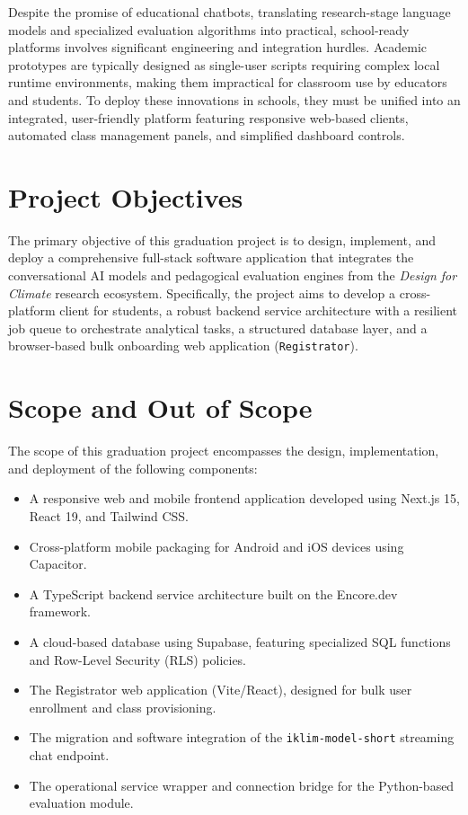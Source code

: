 \documentclass[12pt,a4paper,oneside]{report}
\begin{document}
    Despite the promise of educational chatbots, translating research-stage language models and specialized evaluation algorithms into practical, school-ready platforms involves significant engineering and integration hurdles. Academic prototypes are typically designed as single-user scripts requiring complex local runtime environments, making them impractical for classroom use by educators and students. To deploy these innovations in schools, they must be unified into an integrated, user-friendly platform featuring responsive web-based clients, automated class management panels, and simplified dashboard controls.

    \section{Project Objectives}
    The primary objective of this graduation project is to design, implement, and deploy a comprehensive full-stack software application that integrates the conversational AI models and pedagogical evaluation engines from the \textit{Design for Climate} research ecosystem. Specifically, the project aims to develop a cross-platform client for students, a robust backend service architecture with a resilient job queue to orchestrate analytical tasks, a structured database layer, and a browser-based bulk onboarding web application (\texttt{Registrator}).

    \section{Scope and Out of Scope}
    The scope of this graduation project encompasses the design, implementation, and deployment of the following components:
    \begin{itemize}
        \item A responsive web and mobile frontend application developed using Next.js 15, React 19, and Tailwind CSS.
        \item Cross-platform mobile packaging for Android and iOS devices using Capacitor.
        \item A TypeScript backend service architecture built on the Encore.dev framework.
        \item A cloud-based database using Supabase, featuring specialized SQL functions and Row-Level Security (RLS) policies.
        \item The Registrator web application (Vite/React), designed for bulk user enrollment and class provisioning.
        \item The migration and software integration of the \texttt{iklim-model-short} streaming chat endpoint.
        \item The operational service wrapper and connection bridge for the Python-based evaluation module.
    \end{itemize}
\end{document}
